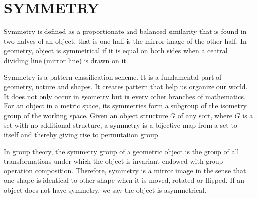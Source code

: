 \documentclass[a4paper, 12pt, openany]{report}
\begin{document}
	\section{SYMMETRY} Symmetry is defined as a proportionate and balanced similarity that is found in two halves of an object, that is one-half is the mirror image of the other half. In geometry, object is symmetrical if it is equal on both sides when a central dividing line (mirror line) is drawn on it.
	
	Symmetry is a pattern classification scheme. It is a fundamental part of geometry, nature and shapes. It creates pattern that help us organize our world. It does not only occur in geometry but in every other branches of mathematics. For an object in a metric space, its symmetries form a subgroup of the isometry group of the working space. Given an object structure $G$ of any sort, where $G$ is a set with no additional structure, a symmetry is a bijective map from a set to itself and thereby giving rise to permutation group.
	
	In group theory, the symmetry group of a geometric object is the group of all transformations under which the object is invariant endowed with group operation composition. Therefore, symmetry is a mirror image in the sense that one shape is identical to other shape when it is moved, rotated or flipped. If an object does not have symmetry, we say the object is asymmetrical.
		
\end{document}
